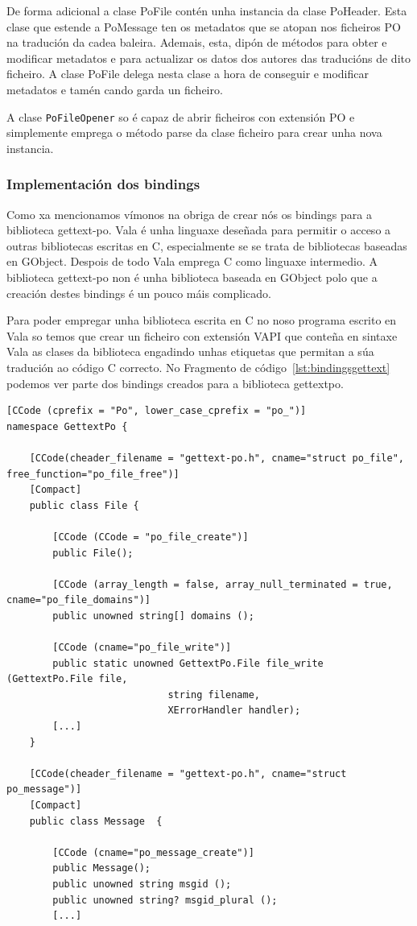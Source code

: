 De forma adicional a clase PoFile contén unha instancia da clase PoHeader. Esta clase que estende a PoMessage ten os metadatos que se atopan nos ficheiros PO na tradución da cadea baleira. Ademais, esta, dipón de métodos para obter e modificar metadatos e para actualizar os datos dos autores das traducións de dito ficheiro. A clase PoFile delega nesta clase a hora de conseguir e modificar metadatos e tamén cando garda un ficheiro.

A clase \lstinline{PoFileOpener} so é capaz de abrir ficheiros con extensión PO e simplemente emprega o método parse da clase ficheiro para crear unha nova instancia.

\subsubsection{Implementación dos bindings}
Como xa mencionamos vímonos na obriga de crear nós os bindings para a biblioteca gettext-po. Vala é unha linguaxe deseñada para permitir o acceso a outras bibliotecas escritas en C, especialmente se se trata de bibliotecas baseadas en GObject. Despois de todo Vala emprega C como linguaxe intermedio. A biblioteca gettext-po non é unha biblioteca baseada en GObject polo que a creación destes bindings é un pouco máis complicado.

Para poder empregar unha biblioteca escrita en C no noso programa escrito en Vala so temos que crear un ficheiro con extensión VAPI que conteña en sintaxe Vala as clases da biblioteca engadindo unhas etiquetas que permitan a súa tradución ao código C correcto. No Fragmento de código~\ref{lst:bindingsgettext} podemos ver parte dos bindings creados para a biblioteca gettextpo.

\lstset{language=[sharp]C}
\begin{lstlisting}[label=lst:bindingsgettext,caption=Bindings da biblioteca GettextPo]
[CCode (cprefix = "Po", lower_case_cprefix = "po_")]
namespace GettextPo {

    [CCode(cheader_filename = "gettext-po.h", cname="struct po_file", free_function="po_file_free")]
    [Compact]
    public class File {

        [CCode (CCode = "po_file_create")]
        public File();

        [CCode (array_length = false, array_null_terminated = true, cname="po_file_domains")]
        public unowned string[] domains ();

        [CCode (cname="po_file_write")]
        public static unowned GettextPo.File file_write (GettextPo.File file,
                            string filename,
                            XErrorHandler handler);
        [...]
    }

    [CCode(cheader_filename = "gettext-po.h", cname="struct po_message")]
    [Compact]
    public class Message  {

        [CCode (cname="po_message_create")]
        public Message();
        public unowned string msgid ();
        public unowned string? msgid_plural ();
        [...]
\end{lstlisting}

